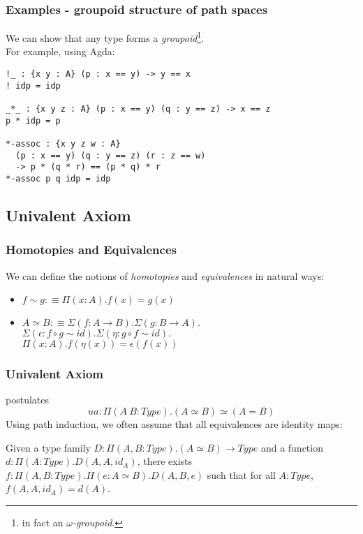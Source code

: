 \documentclass[dvipdfmx]{beamer}
\begin{document}
\begin{frame}[containsverbatim]
  \frametitle{Examples - groupoid structure of path spaces}
  We can show that any type forms a {\it groupoid}\footnote{
    in fact an {\it $\omega$-groupoid}.}.
  \\
  For example, using Agda:

  \begin{verbatim}
!_ : {x y : A} (p : x == y) -> y == x
! idp = idp

_*_ : {x y z : A} (p : x == y) (q : y == z) -> x == z
p * idp = p

*-assoc : {x y z w : A}
  (p : x == y) (q : y == z) (r : z == w)
  -> p * (q * r) == (p * q) * r
*-assoc p q idp = idp
  \end{verbatim}
\end{frame}

\subsection{Univalent Axiom}

\begin{frame}
  \frametitle{Homotopies and Equivalences}
  We can define the notions of {\it homotopies} and {\it equivalences}
  in natural ways:
  \begin{itemize}
    \item
    $f \sim g :\equiv \Pi \left( x : A \right) .
    f \left( x \right) = g \left( x \right)$
    \item
    $A \simeq B :\equiv \Sigma \left( f : A \to B \right) .
    \Sigma \left( g : B \to A \right) .$ \\
    $\Sigma \left( \epsilon : f \circ g \sim id \right) .
    \Sigma \left( \eta : g \circ f \sim id \right) .$ \\
    $\Pi \left( x : A \right) .
    f \left( \eta \left( x \right) \right) = \epsilon \left( f \left( x \right) \right)$
  \end{itemize}
\end{frame}

\begin{frame}
  \frametitle{Univalent Axiom}
  postulates
  $$
  ua : \Pi \left( A \ B : Type \right) .
  \left( A \simeq B \right) \simeq \left( A = B \right)
  $$
  Using path induction,
  we often assume that all equivalences are identity maps:

  \begin{theorem}
    Given a type family
    $D : \Pi \left( A , B : Type \right) . \left( A \simeq B \right)
    \to Type$ and a function
    $d : \Pi \left( A : Type \right) . D \left( A , A , id_A \right)$,
    there exists
    $f : \Pi \left( A , B : Type \right) .
    \Pi \left( e : A \simeq B \right) .
    D \left( A , B , e \right)$ such that
    for all $A : Type$,
    $f \left( A , A , id_A \right) = d \left( A \right)$.
  \end{theorem}
\end{frame}
\end{document}
